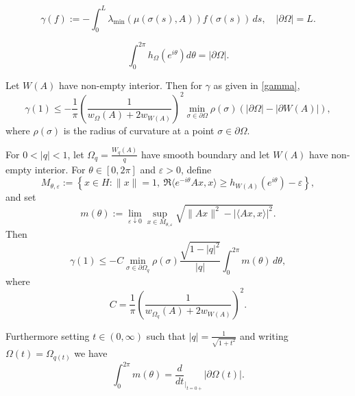 \documentclass[10pt,a4paper]{amsart}
\begin{document}
\begin{equation}\label{gamma}
    \gamma(f) := - \int_0^L \lambda_{\min}( \mu ( \sigma (s), A ) ) 
f( \sigma(s) )\,ds , \quad |\partial \Omega| = L .
\end{equation}

\begin{Lemma}\label{per}
$$
\int_0^{2 \pi} h_{\Omega}( e ^{i \theta}) d \theta = |\partial \Omega|.
$$
\end{Lemma}

\begin{Theorem}\label{maingamma}
Let $W(A)$ have non-empty interior. Then for $\gamma$ as given in \eqref{gamma},
    $$
    \gamma(1) \leq - \frac{1}{\pi }\left(\frac{1}{w_{\Omega}(A) + 2w_{W(A)}}\right)^2 \min_{\sigma \in \partial \Omega}\rho (\sigma)   \left( |\partial \Omega| -  | \partial W(A)| \right),
    $$
    where $\rho (\sigma) $ is the radius of curvature at a point $ \sigma \in \partial \Omega$.
\end{Theorem}

\begin{Theorem}
For $0 < |q| < 1$, let $\Omega_q = \frac{W_q(A)}{q}$ have smooth boundary and let $W(A)$ have non-empty interior. For $\theta\in[0,2\pi]$ and $\varepsilon>0$, define
\[
M_{\theta,\varepsilon}
:=
\left\{
x\in H:\|x\|=1,\ 
\Re\langle e^{-i\theta}Ax,x\rangle
\ge h_{W(A)}(e^{i\theta})-\varepsilon
\right\},
\]
and set
\[
m(\theta)
:=
\lim_{\varepsilon\downarrow 0}
\sup_{x\in M_{\theta,\varepsilon}}
\sqrt{\|Ax\|^2-|\langle Ax,x\rangle|^2}.
\]
Then
\[
\gamma(1)\le
-C\min_{\sigma\in\partial\Omega_q}\rho(\sigma)
\frac{\sqrt{1-|q|^2}}{|q|}
\int_0^{2\pi} m(\theta)\,d\theta,
\]
where
\[
C=\frac1\pi\left(\frac{1}{w_{\Omega_q}(A)+2w_{W(A)}}\right)^2.
\]

















Furthermore setting $t \in (0, \infty)$ such that $|q| = \frac{1}{\sqrt{1+t^2}}$ and writing $ \Omega(t) =  \Omega_{q(t)}$ we have 
$$
\int_0^{2 \pi} m(\theta) = \frac{d}{dt}_{|_{t=0+}}\left|\partial\Omega(t) \right|.
$$
\end{Theorem}
\end{document}

